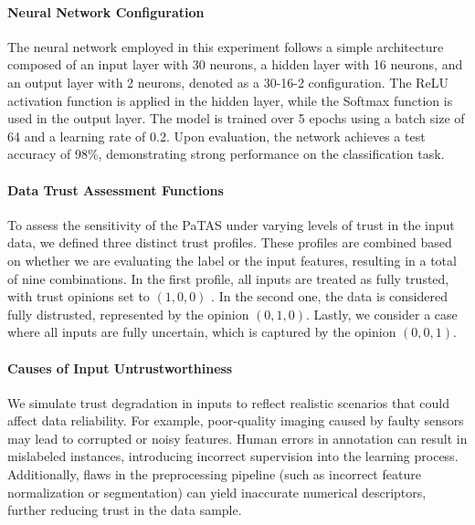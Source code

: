 \paragraph{Neural Network Configuration}
The neural network employed in this experiment follows a simple architecture composed of an input layer with 30 neurons, a hidden layer with 16 neurons, and an output layer with 2 neurons, denoted as a 30-16-2 configuration. The ReLU activation function is applied in the hidden layer, while the Softmax function is used in the output layer. The model is trained over 5 epochs using a batch size of 64 and a learning rate of 0.2. Upon evaluation, the network achieves a test accuracy of 98\%, demonstrating strong performance on the classification task.


\paragraph{Data Trust Assessment Functions}
To assess the sensitivity of the PaTAS under varying levels of trust in the input data, we defined three distinct trust profiles. These profiles are combined based on whether we are evaluating the label or the input features, resulting in a total of nine combinations. In the first profile, all inputs are treated as fully trusted, with trust opinions set to $(1,0,0)$ . In the second one, the data is considered fully distrusted, represented by the opinion $(0,1,0)$. Lastly, we consider a case where all inputs are fully uncertain, which is captured by the opinion $(0,0,1)$.

\paragraph{Causes of Input Untrustworthiness}
We simulate trust degradation in inputs to reflect realistic scenarios that could affect data reliability. For example, poor-quality imaging caused by faulty sensors may lead to corrupted or noisy features. Human errors in annotation can result in mislabeled instances, introducing incorrect supervision into the learning process. Additionally, flaws in the preprocessing pipeline (such as incorrect feature normalization or segmentation) can yield inaccurate numerical descriptors, further reducing trust in the data sample.

